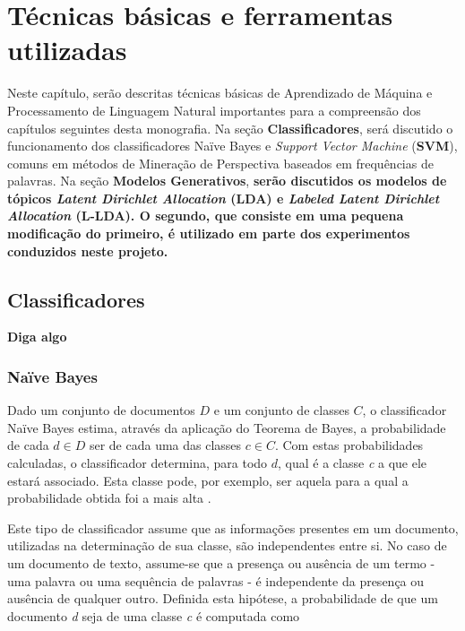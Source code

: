 \chapter{Técnicas básicas e ferramentas utilizadas}

Neste capítulo, serão descritas técnicas básicas de Aprendizado de Máquina e Processamento de Linguagem Natural importantes para a compreensão dos capítulos seguintes desta monografia. Na seção \textbf{Classificadores}, será discutido o funcionamento dos classificadores Naïve Bayes e \emph{Support Vector Machine} (\textbf{SVM}), comuns em métodos de Mineração de Perspectiva baseados em frequências de palavras. Na seção \textbf{Modelos Generativos}, \textbf{serão discutidos os modelos de tópicos \emph{Latent Dirichlet Allocation} (\textbf{LDA}) e \emph{Labeled Latent Dirichlet Allocation} (\textbf{L-LDA}). O segundo, que consiste em uma pequena modificação do primeiro, é utilizado em parte dos experimentos conduzidos neste projeto.}

\section{Classificadores}
\textbf{Diga algo}

\subsection{Naïve Bayes}
\label{subsection:bayes}


Dado um conjunto de documentos \ensuremath{D} e um conjunto de classes \ensuremath{C}, o classificador Naïve Bayes estima, através da aplicação do Teorema de Bayes,  a probabilidade de cada \ensuremath{d \in D} ser de cada uma das classes \ensuremath{c \in C}. Com estas probabilidades calculadas, o classificador determina, para todo \ensuremath{d}, qual é a classe \emph{c} a que ele estará associado. Esta classe pode, por exemplo, ser aquela para a qual a probabilidade obtida foi a mais alta \cite{durant-smith} \cite{naive-forty}.

Este tipo de classificador assume que as informações presentes em um documento, utilizadas na determinação de sua classe, são independentes entre si. No caso de um documento de texto, assume-se que a presença ou ausência de um termo - uma palavra ou uma sequência de palavras - é independente da presença ou ausência de qualquer outro. Definida esta hipótese, a probabilidade de que um documento \emph{d} seja de uma classe \emph{c} é computada como

